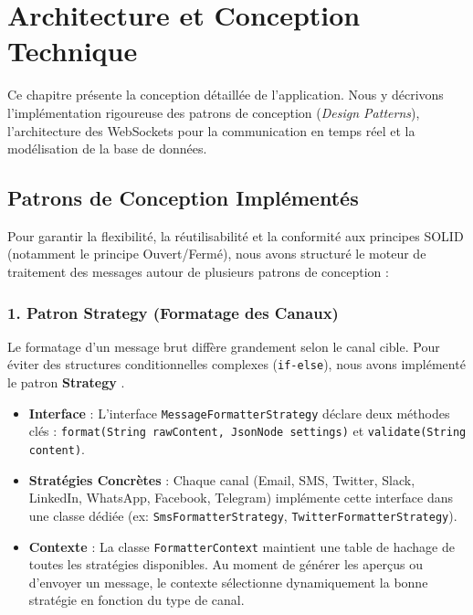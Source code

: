 \chapter{Architecture et Conception Technique}
\label{chapter:conception}

Ce chapitre présente la conception détaillée de l'application. Nous y décrivons l'implémentation rigoureuse des patrons de conception (\textit{Design Patterns}), l'architecture des WebSockets pour la communication en temps réel et la modélisation de la base de données.

\section{Patrons de Conception Implémentés}

Pour garantir la flexibilité, la réutilisabilité et la conformité aux principes SOLID (notamment le principe Ouvert/Fermé), nous avons structuré le moteur de traitement des messages autour de plusieurs patrons de conception :

\subsection{1. Patron Strategy (Formatage des Canaux)}
Le formatage d'un message brut diffère grandement selon le canal cible. Pour éviter des structures conditionnelles complexes (\texttt{if-else}), nous avons implémenté le patron \textbf{Strategy} \cite{designpatterns}.
\begin{itemize}
    \item \textbf{Interface} : L'interface \texttt{MessageFormatterStrategy} déclare deux méthodes clés : \texttt{format(String rawContent, JsonNode settings)} et \texttt{validate(String content)}.
    \item \textbf{Stratégies Concrètes} : Chaque canal (Email, SMS, Twitter, Slack, LinkedIn, WhatsApp, Facebook, Telegram) implémente cette interface dans une classe dédiée (ex: \texttt{SmsFormatterStrategy}, \texttt{TwitterFormatterStrategy}).
    \item \textbf{Contexte} : La classe \texttt{FormatterContext} maintient une table de hachage de toutes les stratégies disponibles. Au moment de générer les aperçus ou d'envoyer un message, le contexte sélectionne dynamiquement la bonne stratégie en fonction du type de canal.
\end{itemize}

